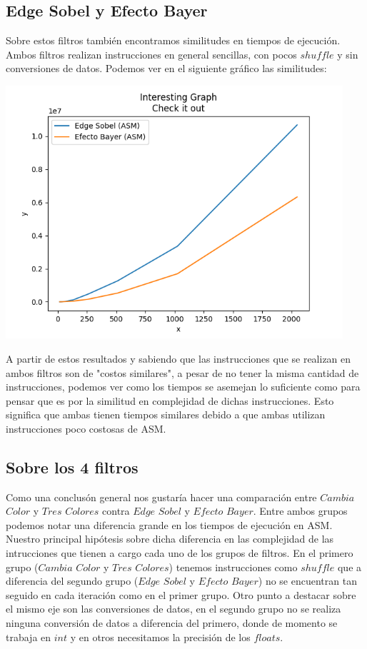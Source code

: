 \subsection{Edge Sobel y Efecto Bayer}

Sobre estos filtros también encontramos similitudes en tiempos de ejecución. Ambos filtros realizan instrucciones en general sencillas, con pocos $shuffle$ y sin conversiones de datos. Podemos ver en el siguiente gráfico las similitudes:


\vspace{6px}
\begin{center}
\includegraphics[width=12.5cm, height=9
cm]{images/sobel_bayer.png}
\end{center}
\vspace{6px}


A partir de estos resultados y sabiendo que las instrucciones que se realizan en ambos filtros son de "costos similares", a pesar de no tener la misma cantidad de instrucciones, podemos ver como los tiempos se asemejan lo suficiente como para pensar que es por la similitud en complejidad de dichas instrucciones. Esto significa que ambas tienen tiempos similares debido a que ambas utilizan instrucciones poco costosas de ASM. 


\subsection{Sobre los 4 filtros}

Como una conclusón general nos gustaría hacer una comparación entre $Cambia$ $Color$ y $Tres$ $Colores$ contra $Edge$ $Sobel$ y $Efecto$ $Bayer$. 
Entre ambos grupos podemos notar una diferencia grande en los tiempos de ejecución en ASM. 
Nuestro principal hipótesis sobre dicha diferencia en las complejidad de las intrucciones que tienen a cargo cada uno de los grupos de filtros. En el primero grupo ($Cambia$ $Color$ y $Tres$ $Colores$) tenemos instrucciones como $shuffle$ que a diferencia del segundo grupo ($Edge$ $Sobel$ y $Efecto$ $Bayer$) no se encuentran tan seguido en cada iteración como en el primer grupo. Otro punto a destacar sobre el mismo eje son las conversiones de datos, en el segundo grupo no se realiza ninguna conversión de datos a diferencia del primero, donde de momento se trabaja en $int$ y en otros necesitamos la precisión de los $floats$. 